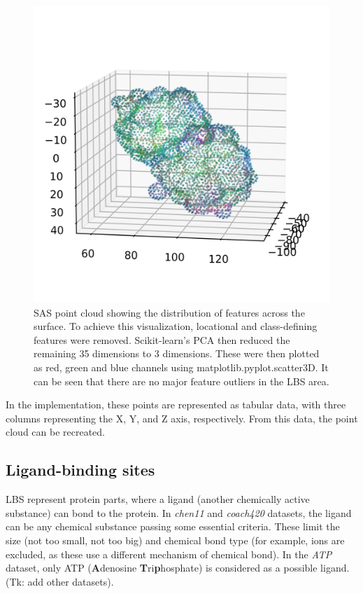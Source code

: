 \begin{figure}
    \centering
    \includegraphics[width=1\linewidth]{point_cloud_pca.png}
    \caption{SAS point cloud showing the distribution of features across the surface. To achieve this visualization, locational and class-defining features were removed. Scikit-learn's PCA then reduced the remaining 35 dimensions to 3 dimensions. These were then plotted as red, green and blue channels using matplotlib.pyplot.scatter3D. It can be seen that there are no major feature outliers in the LBS area.}
    \label{fig:pca_point_cloud}
\end{figure}

In the implementation, these points are represented as tabular data, with three columns representing the X, Y, and Z axis, respectively. From this data, the point cloud can be recreated.

\subsection{Ligand-binding sites}

LBS represent protein parts, where a ligand (another chemically active substance) can bond to the protein. In \textit{chen11} and \textit{coach420} datasets, the ligand can be any chemical substance passing some essential criteria. These limit the size (not too small, not too big) and chemical bond type (for example, ions are excluded, as these use a different mechanism of chemical bond). In the \textit{ATP} dataset, only ATP (\textbf{A}denosine \textbf{T}ri\textbf{p}hosphate) is considered as a possible ligand. (Tk: add other datasets).

